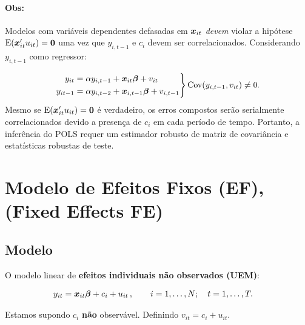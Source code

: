 \documentclass[11pt, oneside, a4paper, article]{article}
\numberwithin{equation}{section}
\begin{document}
\paragraph{Obs:}
Modelos com variáveis dependentes defasadas em $\boldsymbol{x}_{it}$ \textit{devem} violar a hipótese $\text{E}(\boldsymbol{x}_{it}'u_{it} ) = \boldsymbol{0}$ uma vez que $y_{i, t-1}$ e $c_{i}$ devem ser correlacionados.
Considerando $y_{i, t-1}$ como regressor:

\vspace{-1 em}
\begin{align*}
\left.
\begin{aligned}
	y_{it} &= \alpha y_{i, t-1} + \boldsymbol{x}_{it} \boldsymbol{\beta} + v_{it}
	\\
	y_{it-1} &= \alpha y_{i, t-2} + \boldsymbol{x}_{i,t-1} \boldsymbol{\beta} + v_{i,t-1}
\end{aligned}
\right\}
\text{Cov}(y_{i, t-1}, v_{it}) \neq 0.
\end{align*}
Mesmo se $\text{E}(\boldsymbol{x}_{it}'u_{it} ) = \boldsymbol{0}$  é verdadeiro, os erros compostos serão serialmente correlacionados devido a presença de $c_{i}$ em cada período de tempo.
Portanto, a inferência do POLS requer um estimador robusto de matriz de covariância e estatísticas robustas de teste.

\clearpage
\section{Modelo de Efeitos Fixos (EF), (Fixed Effects FE)}
\noindent
\citet[Sec.10.5 -- Fixed Effects Methods, p.265]{wool-2010}

\subsection{Modelo}

O modelo linear de \textbf{efeitos individuais não observados (UEM)}:

\vspace{-1 em}
\begin{align} \label{fe:mod:1}
	y_{it} &= \boldsymbol{x}_{it} \boldsymbol{\beta} + c_{i} + u_{it} 
	\, , \qquad	i = 1, \dots, N; \quad t = 1, \dots, T.
\end{align}

\noindent
Estamos supondo $c_{i}$ \textbf{não} observável.
Definindo $v_{it} = c_{i} + u_{it}$.
\end{document}
